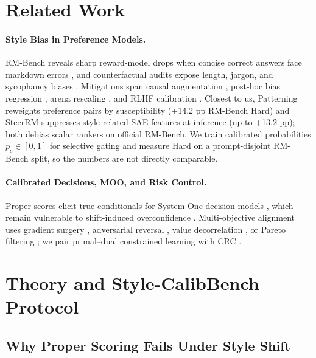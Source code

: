 \documentclass[letterpaper]{article} %
\begin{document}
\section{Related Work}

\paragraph{Style Bias in Preference Models.}
RM-Bench reveals sharp reward-model drops when concise correct answers face markdown errors \citep{liu2025rmbench}, and counterfactual audits expose length, jargon, and sycophancy biases \citep{bharadwaj2026flattery}. Mitigations span causal augmentation \citep{kim2026causal}, post-hoc bias regression \citep{huang2025posthoc}, arena rescaling \citep{zhu2025charm}, and RLHF calibration \citep{leng2025overconf}. Closest to us, Patterning \citep{wang2026patterning} reweights preference pairs by susceptibility (+14.2 pp RM-Bench Hard) and SteerRM \citep{sun2026steerrm} suppresses style-related SAE features at inference (up to +13.2 pp); both debias scalar rankers on official RM-Bench. We train calibrated probabilities $p_c\in[0,1]$ for selective gating and measure Hard on a prompt-disjoint RM-Bench split, so the numbers are not directly comparable.

\paragraph{Calibrated Decisions, MOO, and Risk Control.}
Proper scores elicit true conditionals \citep{gneiting2007scoring} for System-One decision models \citep{typesafe2026jev,justaskjev2026,openjev2026prdo,deusser2026jevbench}, which remain vulnerable to shift-induced overconfidence \citep{epstein2026fermieval}. Multi-objective alignment uses gradient surgery \citep{yu2020gradient}, adversarial reversal \citep{ganin2015unsupervised}, value decorrelation \citep{xu2026mva}, or Pareto filtering \citep{gu2026paretohqd}; we pair primal--dual constrained learning \citep{chamon2020probably} with CRC \citep{angelopoulos2024conformal}.

\section{Theory and Style-CalibBench Protocol}

\subsection{Why Proper Scoring Fails Under Style Shift}
\end{document}
